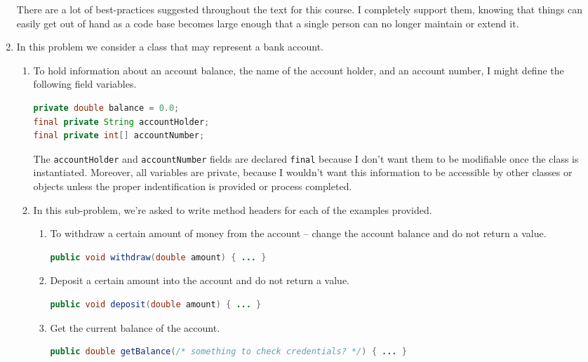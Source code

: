 \documentclass[leqno, 11pt]{article}
\begin{document}
\begin{enumerate}
        There are a lot of best-practices suggested throughout the text for this course. I completely support them, knowing that things can easily get out of hand as a code base becomes large enough that a single person can no longer maintain or extend it.
  \item In this problem we consider a class that may represent a bank account.
        \begin{enumerate}[label=\alph*.]
          \item To hold information about an account balance, the name of the account holder, and an account number, I might define the following field variables.
                \begin{lstlisting}[language=java, xleftmargin=0.3\textwidth]
private double balance = 0.0;
final private String accountHolder;
final private int[] accountNumber;
                \end{lstlisting}
                The \texttt{accountHolder} and \texttt{accountNumber} fields are declared \texttt{final} because I don't want them to be modifiable once the class is instantiated. Moreover, all variables are private, because I wouldn't want this information to be accessible by other classes or objects unless the proper indentification is provided or process completed.
          \item In this sub-problem, we're asked to write method headers for each of the examples provided.
                \begin{enumerate}[label=\roman*.]
                  \item To withdraw a certain amount of money from the account -- change the account balance and do not return a value.
                        \begin{lstlisting}[language=java, xleftmargin=0.22\textwidth]
public void withdraw(double amount) { ... }
                        \end{lstlisting}
                  \item Deposit a certain amount into the account and do not return a value.
                        \begin{lstlisting}[language=java, xleftmargin=0.2\textwidth]
public void deposit(double amount) { ... }
                        \end{lstlisting}
                  \item Get the current balance of the account.
                        \begin{lstlisting}[language=java, xleftmargin=0.06\textwidth]
public double getBalance(/* something to check credentials? */) { ... }

\end{lstlisting}
\end{enumerate}
\end{enumerate}
\end{enumerate}
\end{document}
